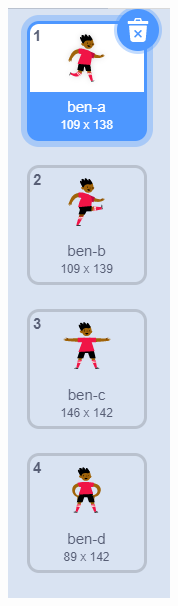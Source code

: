 \documentclass[10pt, a4paper]{article}
\begin{document}
\begin{enumerate}
         \begin{figure}[htbp]
            \centering
            \begin{minipage}[t]{.08\textwidth}
                \centering
                \includegraphics[width=\textwidth]{7.png}

\end{minipage}
\end{figure}
\end{enumerate}
\end{document}

